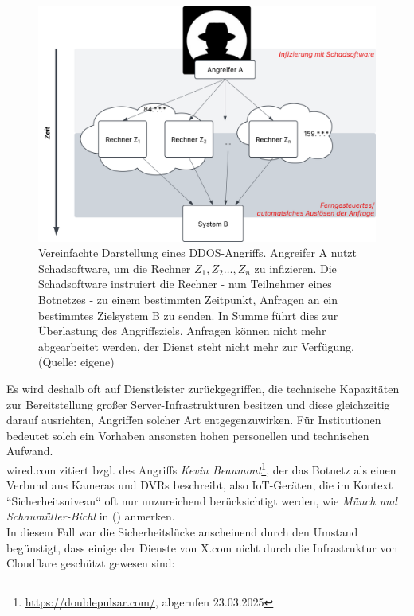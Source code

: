 \begin{figure}
    \centering
    \includegraphics[scale=0.3]{aufgabe 2/img/ddos.svg}
    \caption{Vereinfachte Darstellung eines DDOS-Angriffs. Angreifer A nutzt Schadsoftware, um die Rechner $Z_1, Z_2 \ldots, Z_n$ zu infizieren. Die Schadsoftware instruiert die Rechner - nun Teilnehmer eines Botnetzes - zu einem bestimmten Zeitpunkt, Anfragen an ein bestimmtes Zielsystem B zu senden. In Summe führt dies zur Überlastung des Angriffsziels. Anfragen können nicht mehr abgearbeitet werden, der Dienst steht nicht mehr zur Verfügung. (Quelle: eigene)}
    \label{fig:ddos}
\end{figure}

\noindent
Es wird deshalb oft auf Dienstleister zurückgegriffen, die technische Kapazitäten zur Bereitstellung großer Server-Infrastrukturen besitzen und diese gleichzeitig darauf ausrichten, Angriffen solcher Art entgegenzuwirken.
Für Institutionen bedeutet solch ein Vorhaben ansonsten hohen personellen und technischen Aufwand.\\

\noindent
wired.com zitiert bzgl. des Angriffs \textit{Kevin Beaumont}\footnote{
    \url{https://doublepulsar.com/}, abgerufen 23.03.2025
}, der das Botnetz als einen Verbund aus Kameras und DVRs beschreibt, also IoT-Geräten, die im Kontext ``Sicherheitsniveau`` oft nur unzureichend berücksichtigt werden, wie \textit{Münch und Schaumüller-Bichl} in (\cite[36]{ITS2}) anmerken.\\
In diesem Fall war die Sicherheitslücke anscheinend durch den Umstand begünstigt, dass einige der Dienste von X.com nicht durch die Infrastruktur von Cloudflare geschützt gewesen sind:


